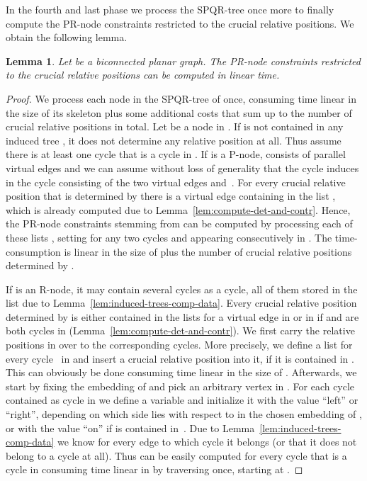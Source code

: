 \documentclass{scrartcl}
\renewcommand{\todo}[1]{}
\newcommand{\1}[1]{{\normalfont \ensuremath{#1^{\tiny\circled{1}}}}} \newcommand{\2}[1]{{\normalfont \ensuremath{#1^{\tiny\circled{2}}}}} \renewcommand{\k}[1]{{\normalfont \ensuremath{#1^{\tiny\circled{k}}}}} \newcommand{\proj}[2]{\ensuremath{\left.#1\right|_{#2}}} \newcommand{\eps}{\varepsilon}
\theoremstyle{plain} \newtheorem{theorem}{Theorem} \newcounter{lemmacounter} \setcounter{lemmacounter}{0} \newtheorem{lemma}[lemmacounter]{Lemma} \newtheorem{fact}{Fact}  \newtheorem{corollary}{Corollary} \theoremstyle{definition} \newtheorem{definition}{Definition}
\begin{document}
In the fourth and last phase we process the SPQR-tree 
once more to finally compute the PR-node constraints restricted to the
crucial relative positions.  We obtain the following lemma.

\begin{lemma}
  \label{lem:computing-pr-node-constr}
  Let  be a biconnected planar graph.  The PR-node constraints
  restricted to the crucial relative positions can be computed in
  linear time.
\end{lemma}
\begin{proof}
  We process each node in the SPQR-tree  of  once,
  consuming time linear in the size of its skeleton plus some
  additional costs that sum up to the number of crucial relative
  positions in total.  Let  be a node in .  If 
  is not contained in any induced tree , it does
  not determine any relative position at all.  Thus assume there is at
  least one cycle that is a cycle in .  If  is a P-node,
   consists of  parallel virtual edges  and we can assume without loss of generality that
  the cycle  induces in  the cycle  consisting
  of the two virtual edges  and~.  For every crucial
  relative position  that is determined by  there
  is a virtual edge  containing
   in the list , which is already computed due to
  Lemma~\ref{lem:compute-det-and-contr}.  Hence, the PR-node
  constraints stemming from  can be computed by processing each
  of these lists , setting  for any two cycles  and  appearing
  consecutively in .  The time-consumption is linear in
  the size of  plus the number of crucial relative
  positions determined by .

  If  is an R-node, it may contain several cycles as a cycle, all
  of them stored in the list  due to
  Lemma~\ref{lem:induced-trees-comp-data}.  Every crucial relative
  position  determined by  is either contained in the
  lists  for a virtual edge  in  or in
   if  and  are both cycles in 
  (Lemma~\ref{lem:compute-det-and-contr}).  We first carry the
  relative positions in  over to the corresponding
  cycles.  More precisely, we define a list  for every
  cycle~ in  and insert a crucial relative position
   into it, if it is contained in .  This
  can obviously be done consuming time linear in the size of
  .  Afterwards, we start by fixing the embedding of
   and pick an arbitrary vertex  in .
  For each cycle  contained as cycle  in  we
  define a variable  and initialize it with the value
  ``left'' or ``right'', depending on which side  lies \todo{Pag
    20, line 18:}with respect to  in the chosen embedding of
  , or with the value ``on'' if  is contained in~.
  Due to Lemma~\ref{lem:induced-trees-comp-data} we know for every
  edge  to which cycle it belongs (or that it does not belong to
  a cycle at all).  Thus  can be easily computed for every
  cycle  that is a cycle in  consuming time linear in
   by traversing  once, starting at .


\end{proof}
\end{document}
